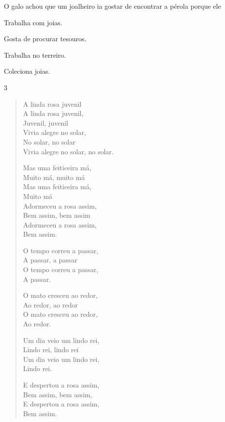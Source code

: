 
O galo achou que um joalheiro ia gostar de encontrar a pérola porque ele

\begin{escolha}
\item Trabalha com joias.

\item Gosta de procurar tesouros.

\item Trabalha no terreiro.

\item Coleciona joias.
\end{escolha}


\num{3}

\begin{verse}
A linda rosa juvenil\\
A linda rosa juvenil,\\
Juvenil, juvenil\\
Vivia alegre no solar,\\
No solar, no solar\\
Vivia alegre no solar, no solar.

Mas uma feiticeira má,\\
Muito má, muito má\\
Mas uma feiticeira má,\\
Muito má\\
Adormeceu a rosa assim,\\
Bem assim, bem assim\\
Adormeceu a rosa assim,\\
Bem assim.

O tempo correu a passar,\\
A passar, a passar\\
O tempo correu a passar,\\
A passar.

O mato cresceu ao redor,\\
Ao redor, ao redor\\
O mato cresceu ao redor,\\
Ao redor.

Um dia veio um lindo rei,\\
Lindo rei, lindo rei\\
Um dia veio um lindo rei,\\
Lindo rei.

E despertou a rosa assim,\\
Bem assim, bem assim,\\
E despertou a rosa assim,\\
Bem assim.
\end{verse}

